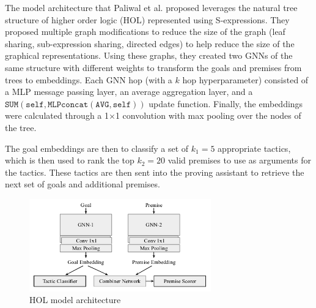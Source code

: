 \documentclass{article}
\begin{document}
The model architecture that Paliwal et al. proposed leverages the natural tree structure  of higher order logic (HOL) represented using S-expressions. They proposed multiple graph modifications to reduce the size of the graph (leaf sharing, sub-expression sharing, directed edges) to help reduce the size of the graphical representations. Using these graphs, they created two GNNs of the same structure with different weights to transform the goals and premises from trees to embeddings. Each GNN hop (with a $k$ hop hyperparameter) consisted of a MLP message passing layer, an average aggregation layer, and a $\texttt{SUM}(\texttt{self}, \texttt{MLP}\texttt{concat}(\texttt{AVG}, \texttt{self}))$ update function. Finally, the embeddings were calculated through a 1$\times$1 convolution with max pooling over the nodes of the tree.

The goal embeddings are then to classify a set of $k_1 = 5$ appropriate tactics, which is then used to rank the top $k_2 = 20$ valid premises to use as arguments for the tactics. These tactics are then sent into the proving assistant to retrieve the next set of goals and additional premises. 

\begin{figure}[H]
    \centering
    \includegraphics[width=0.7\textwidth]{images/HOL_model_architecture.png}
    \caption{HOL model architecture \cite{hol}}
    \label{fig:hol_arch}
\end{figure}
\end{document}

